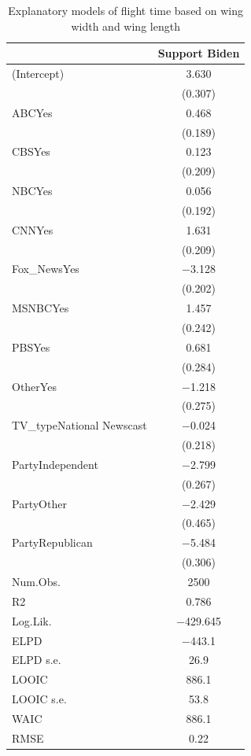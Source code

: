 \documentclass[
  letterpaper,
  DIV=11,
  numbers=noendperiod]{scrartcl}
\begin{document}
\hypertarget{tbl-modelresults}{}
\begin{table}
\caption{\label{tbl-modelresults}Explanatory models of flight time based on wing width and wing length }\tabularnewline

\centering
\begin{tabular}[t]{lc}
\toprule
  & Support Biden\\
\midrule
(Intercept) & \num{3.630}\\
 & (\num{0.307})\\
ABCYes & \num{0.468}\\
 & (\num{0.189})\\
CBSYes & \num{0.123}\\
 & \vphantom{1} (\num{0.209})\\
NBCYes & \num{0.056}\\
 & (\num{0.192})\\
CNNYes & \num{1.631}\\
 & (\num{0.209})\\
Fox\_NewsYes & \num{-3.128}\\
 & (\num{0.202})\\
MSNBCYes & \num{1.457}\\
 & (\num{0.242})\\
PBSYes & \num{0.681}\\
 & (\num{0.284})\\
OtherYes & \num{-1.218}\\
 & (\num{0.275})\\
TV\_typeNational Newscast & \num{-0.024}\\
 & (\num{0.218})\\
PartyIndependent & \num{-2.799}\\
 & (\num{0.267})\\
PartyOther & \num{-2.429}\\
 & (\num{0.465})\\
PartyRepublican & \num{-5.484}\\
 & (\num{0.306})\\
\midrule
Num.Obs. & \num{2500}\\
R2 & \num{0.786}\\
Log.Lik. & \num{-429.645}\\
ELPD & \num{-443.1}\\
ELPD s.e. & \num{26.9}\\
LOOIC & \num{886.1}\\
LOOIC s.e. & \num{53.8}\\
WAIC & \num{886.1}\\
RMSE & \num{0.22}\\
\bottomrule
\end{tabular}
\end{table}
\end{document}
